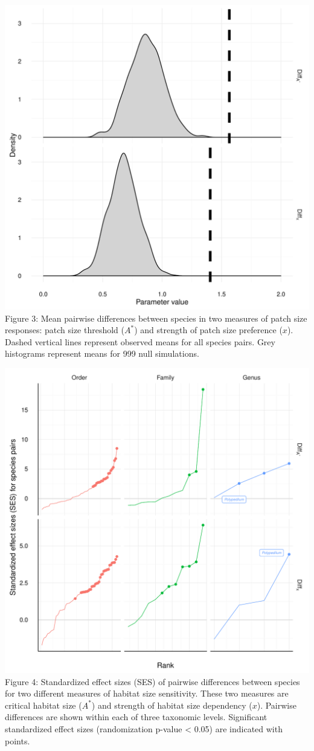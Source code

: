 \includegraphics[width=5.5in]{figures/overall_null.pdf} Figure 3: Mean pairwise
differences between species in two measures of patch size responses:
patch size threshold (\(A^{*}\)) and strength of patch size preference
(\(x\)). Dashed vertical lines represent observed means for all species
pairs. Grey histograms represent means for 999 null simulations.

\includegraphics[width=5.5in]{figures/ses_rank.pdf}\\
Figure 4: Standardized effect sizes (SES) of pairwise differences
between species for two different measures of habitat size sensitivity.
These two measures are critical habitat size (\(A^{*}\)) and strength of
habitat size dependency (\(x\)). Pairwise differences are shown within
each of three taxonomic levels. Significant standardized effect sizes
(randomization p-value \textless{} 0.05) are indicated with points.

